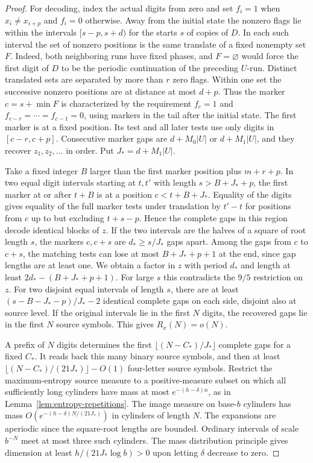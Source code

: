 \begin{proof}
For decoding, index the actual digits from zero and set \(f_i=1\) when \(x_i\ne x_{i+p}\) and \(f_i=0\) otherwise. Away from the initial state the nonzero flags lie within the intervals \([s-p,s+d)\) for the starts \(s\) of copies of \(D\). In each such interval the set of nonzero positions is the same translate of a fixed nonempty set \(F\). Indeed, both neighboring runs have fixed phases, and \(F=\varnothing\) would force the first digit of \(D\) to be the periodic continuation of the preceding \(U\)-run. Distinct translated sets are separated by more than \(r\) zero flags. Within one set the successive nonzero positions are at distance at most \(d+p\). Thus the marker \(c=s+\min F\) is characterized by the requirement \(f_c=1\) and \(f_{c-r}=\cdots=f_{c-1}=0\), using markers in the tail after the initial state. The first marker is at a fixed position. Its test and all later tests use only digits in \([c-r,c+p]\). Consecutive marker gaps are \(d+M_0|U|\) or \(d+M_1|U|\), and they recover \(z_1,z_2,\ldots\) in order. Put \(J_*=d+M_1|U|\).

Take a fixed integer \(B\) larger than the first marker position plus \(m+r+p\). In two equal digit intervals starting at \(t,t'\) with length \(s>B+J_*+p\), the first marker at or after \(t+B\) is at a position \(c<t+B+J_*\). Equality of the digits gives equality of the full marker tests under translation by \(t'-t\) for positions from \(c\) up to but excluding \(t+s-p\). Hence the complete gaps in this region decode identical blocks of \(z\). If the two intervals are the halves of a square of root length \(s\), the markers \(c,c+s\) are \(d_*\ge s/J_*\) gaps apart. Among the gaps from \(c\) to \(c+s\), the matching tests can lose at most \(B+J_*+p+1\) at the end, since gap lengths are at least one. We obtain a factor in \(z\) with period \(d_*\) and length at least \(2d_*-(B+J_*+p+1)\). For large \(s\) this contradicts the \(9/5\) restriction on \(z\). For two disjoint equal intervals of length \(s\), there are at least \((s-B-J_*-p)/J_*-2\) identical complete gaps on each side, disjoint also at source level. If the original intervals lie in the first \(N\) digits, the recovered gaps lie in the first \(N\) source symbols. This gives \(R_x(N)=o(N)\).

A prefix of \(N\) digits determines the first \(\lfloor (N-C_*)/J_*\rfloor\) complete gaps for a fixed \(C_*\). It reads back this many binary source symbols, and then at least \(\lfloor (N-C_*)/(21J_*)\rfloor-O(1)\) four-letter source symbols. Restrict the maximum-entropy source measure to a positive-measure subset on which all sufficiently long cylinders have mass at most \(e^{-(h-\delta)n}\), as in Lemma~\ref{lem:entropy-repetitions}. The image measure on base-\(b\) cylinders has mass \(O(e^{-(h-\delta)N/(21J_*)})\) in cylinders of length \(N\). The expansions are aperiodic since the square-root lengths are bounded. Ordinary intervals of scale \(b^{-N}\) meet at most three such cylinders. The mass distribution principle gives dimension at least \(h/(21J_*\log b)>0\) upon letting \(\delta\) decrease to zero.
\end{proof}

